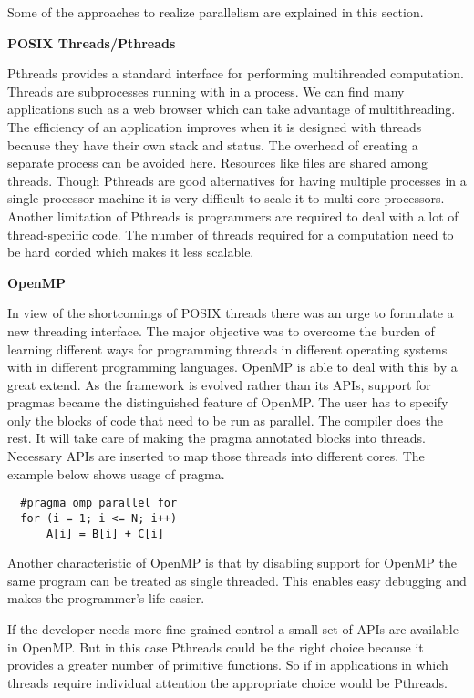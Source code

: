 Some of the approaches to realize parallelism are explained in this section.

\noindent
\textbf{POSIX Threads/Pthreads}

\noindent
Pthreads provides a standard interface for performing multihreaded computation. 
Threads are subprocesses running with in a process. 
We can find many applications such as a web browser which can take advantage of multithreading.
The efficiency of an application improves when it is designed with threads because they have their
own stack and status. The overhead of creating a separate process can be avoided here.
Resources like files are shared among threads. Though Pthreads are good alternatives for
having multiple processes in a single processor machine it is very difficult to scale
it to multi-core processors. Another limitation of Pthreads is programmers are required to
deal with a lot of thread-specific code. The number of threads required for a computation
need to be hard corded which makes it less scalable.


\noindent
\textbf{OpenMP}

\noindent
In view of the shortcomings of POSIX threads there was an urge to formulate a new threading
interface. The major objective was to overcome the burden of learning different ways for programming threads in different
operating systems with in different programming languages. OpenMP is able to deal with this
by a great extend. As the framework is evolved rather than its APIs, support for pragmas became the distinguished
feature of OpenMP. The user has to specify only the blocks of code that need to be run
as parallel. The compiler does the rest. It will take care of making the pragma annotated blocks into
threads. Necessary APIs are inserted to map those threads into different cores. The example below
shows usage of pragma.

{\footnotesize
\begin{lstlisting}
  #pragma omp parallel for
  for (i = 1; i <= N; i++)
      A[i] = B[i] + C[i]
\end{lstlisting}
}

Another characteristic of OpenMP is that by disabling support for OpenMP the same program can be treated as
single threaded. This enables easy debugging and makes the programmer's life easier.

If the developer needs more fine-grained control a small set of APIs are available in OpenMP. But in this case Pthreads
could be the right choice because it provides a greater number of primitive functions. So if in applications
in which threads require individual attention the appropriate choice would be Pthreads.

